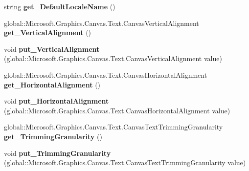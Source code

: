 \begin{DoxyCompactItemize}
string {\bfseries get\+\_\+\+Default\+Locale\+Name} ()
\item 
\mbox{\label{class_microsoft_1_1_graphics_1_1_canvas_1_1_text_1_1_canvas_text_layout_adeddc6c9b2e6402b8d8645e0a439a2dd}} 
global\+::\+Microsoft.\+Graphics.\+Canvas.\+Text.\+Canvas\+Vertical\+Alignment {\bfseries get\+\_\+\+Vertical\+Alignment} ()
\item 
\mbox{\label{class_microsoft_1_1_graphics_1_1_canvas_1_1_text_1_1_canvas_text_layout_a62984a3697135681afc6b8776f3df132}} 
void {\bfseries put\+\_\+\+Vertical\+Alignment} (global\+::\+Microsoft.\+Graphics.\+Canvas.\+Text.\+Canvas\+Vertical\+Alignment value)
\item 
\mbox{\label{class_microsoft_1_1_graphics_1_1_canvas_1_1_text_1_1_canvas_text_layout_a3b97a0cf1741dc7db0af0729a4a4fd99}} 
global\+::\+Microsoft.\+Graphics.\+Canvas.\+Text.\+Canvas\+Horizontal\+Alignment {\bfseries get\+\_\+\+Horizontal\+Alignment} ()
\item 
\mbox{\label{class_microsoft_1_1_graphics_1_1_canvas_1_1_text_1_1_canvas_text_layout_a58b83f1637a8f391083f54a8aa4458be}} 
void {\bfseries put\+\_\+\+Horizontal\+Alignment} (global\+::\+Microsoft.\+Graphics.\+Canvas.\+Text.\+Canvas\+Horizontal\+Alignment value)
\item 
\mbox{\label{class_microsoft_1_1_graphics_1_1_canvas_1_1_text_1_1_canvas_text_layout_a9102f8ce39e24dc440f8622fc04bab18}} 
global\+::\+Microsoft.\+Graphics.\+Canvas.\+Text.\+Canvas\+Text\+Trimming\+Granularity {\bfseries get\+\_\+\+Trimming\+Granularity} ()
\item 
\mbox{\label{class_microsoft_1_1_graphics_1_1_canvas_1_1_text_1_1_canvas_text_layout_a8bd75850c7ca9bc8d4e98c9d18e868de}} 
void {\bfseries put\+\_\+\+Trimming\+Granularity} (global\+::\+Microsoft.\+Graphics.\+Canvas.\+Text.\+Canvas\+Text\+Trimming\+Granularity value)
\item 

\end{DoxyCompactItemize}
